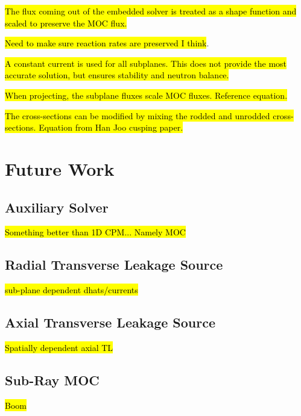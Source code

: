\hl{The flux coming out of the embedded solver is treated as a shape function and scaled to preserve the MOC flux.}

\hl{Need to make sure reaction rates are preserved I think}.

\hl{A constant current is used for all subplanes.  This does not provide the most accurate solution, but ensures stability and neutron balance.}

\hl{When projecting, the subplane fluxes scale MOC fluxes.  Reference equation.}

\hl{The cross-sections can be modified by mixing the rodded and unrodded cross-sections.  Equation from Han Joo cusping paper.}

\section{Future Work}

\subsection{Auxiliary Solver}

\hl{Something better than 1D CPM... Namely MOC}

\subsection{Radial Transverse Leakage Source}

\hl{sub-plane dependent dhats/currents}

\subsection{Axial Transverse Leakage Source}

\hl{Spatially dependent axial TL}

\subsection{Sub-Ray MOC}

\hl{Boom}